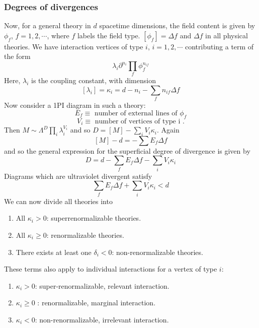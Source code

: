 \subsubsection{Degrees of divergences}
Now, for a general theory in $d$ spacetime dimensions, the field content is given by $\phi_f$, $f=1,2,\cdots$, where $f$ labels
the field type. $[\phi_f]=\Delta f$ and $\Delta f$ in all physical theories. We have interaction vertices of type $i$, $i = 1,2,\cdots$
contributing a term of the form
\[\lambda_i \partial^{n_i} \prod_f \phi_f^{n_{if}}\]
Here, $\lambda_i$ is the coupling constant, with dimension
\[[\lambda_i] = \kappa_i = d - n_i - \sum_f n_{if}\Delta f \]
Now consider a 1PI diagram in such a theory:
\[E_f \equiv \mbox{ number of external lines of } \phi_f\]
\[V_i \equiv \mbox{ number of vertices of type i }.\]
Then $M \sim \Lambda^D \prod_i \lambda_i ^{V_i}$ and so $D = [M] - \sum_i V_i \kappa_i$. Again
\[[M] - d = -\sum E_f \Delta f\]
and so the general expression for the superficial degree of divergence is given by
\[D = d - \sum_f E_f \Delta f - \sum_i V_i \kappa_i\]
Diagrams which are ultraviolet divergent satisfy
\[\sum_f E_f \Delta f + \sum_i V_i \kappa_i < d\]
We can now divide all theories into
\begin{enumerate}
\item All $\kappa_i > 0$: superrenormalizable theories.
\item All $\kappa_i \geq 0$: renormalizable theories.
\item There exists at least one $\delta_i < 0$: non-renormalizable theories.
\end{enumerate}
These terms also apply to individual interactions for a vertex of type $i$:
\begin{enumerate}
\item $\kappa_i > 0$: super-renormalizable, relevant interaction.
\item $\kappa_i \geq 0$ : renormalizable, marginal interaction.
\item $\kappa_i < 0$: non-renormalizable, irrelevant interaction.
\end{enumerate}

